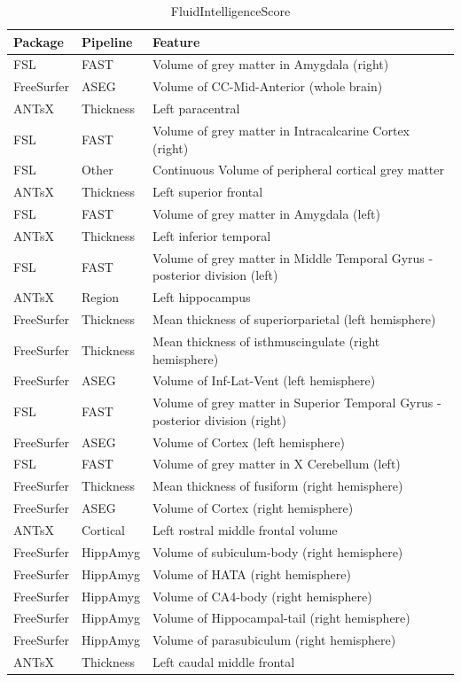 \documentclass[
  10pt,
]{article}
\begin{document}
\begin{table}

\caption{\label{tab:compare-predictions}FluidIntelligenceScore}
\centering
\begin{tabular}[t]{lll}
\toprule
Package & Pipeline & Feature\\
\midrule
FSL & FAST & Volume of grey matter in Amygdala (right)\\
FreeSurfer & ASEG & Volume of CC-Mid-Anterior (whole brain)\\
ANTsX & Thickness & Left paracentral\\
FSL & FAST & Volume of grey matter in Intracalcarine Cortex (right)\\
FSL & Other & Continuous    Volume of peripheral cortical grey matter\\
\addlinespace
ANTsX & Thickness & Left superior frontal\\
FSL & FAST & Volume of grey matter in Amygdala (left)\\
ANTsX & Thickness & Left inferior temporal\\
FSL & FAST & Volume of grey matter in Middle Temporal Gyrus - posterior division (left)\\
ANTsX & Region & Left hippocampus\\
\addlinespace
FreeSurfer & Thickness & Mean thickness of superiorparietal (left hemisphere)\\
FreeSurfer & Thickness & Mean thickness of isthmuscingulate (right hemisphere)\\
FreeSurfer & ASEG & Volume of Inf-Lat-Vent (left hemisphere)\\
FSL & FAST & Volume of grey matter in Superior Temporal Gyrus - posterior division (right)\\
FreeSurfer & ASEG & Volume of Cortex (left hemisphere)\\
\addlinespace
FSL & FAST & Volume of grey matter in X Cerebellum (left)\\
FreeSurfer & Thickness & Mean thickness of fusiform (right hemisphere)\\
FreeSurfer & ASEG & Volume of Cortex (right hemisphere)\\
ANTsX & Cortical & Left rostral middle frontal volume\\
FreeSurfer & HippAmyg & Volume of subiculum-body (right hemisphere)\\
\addlinespace
FreeSurfer & HippAmyg & Volume of HATA (right hemisphere)\\
FreeSurfer & HippAmyg & Volume of CA4-body (right hemisphere)\\
FreeSurfer & HippAmyg & Volume of Hippocampal-tail (right hemisphere)\\
FreeSurfer & HippAmyg & Volume of parasubiculum (right hemisphere)\\
ANTsX & Thickness & Left caudal middle frontal\\
\bottomrule
\end{tabular}
\end{table}
\end{document}
